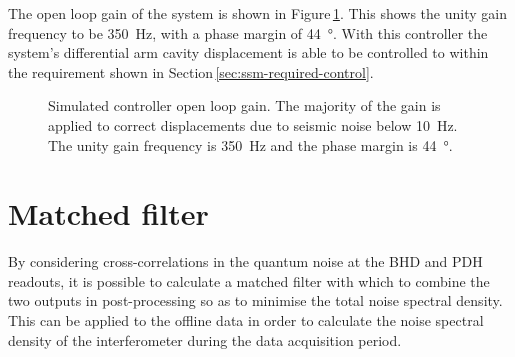 The open loop gain of the system is shown in Figure\,\ref{fig:open-loop-gain}. This shows the unity gain frequency to be \SI{350}{\hertz}, with a phase margin of \SI{44}{\degree}. With this controller the system's differential arm cavity displacement is able to be controlled to within the requirement shown in Section\,\ref{sec:ssm-required-control}.

\begin{figure}
  
  \caption[Simulated controller open loop gain]{\label{fig:open-loop-gain}Simulated \SSM{} controller open loop gain. The majority of the gain is applied to correct displacements due to seismic noise below \SI{10}{\hertz}. The unity gain frequency is \SI{350}{\hertz} and the phase margin is \SI{44}{\degree}.}
\end{figure}

\section{\label{sec:optimal-filter}Matched filter}
By considering cross-correlations in the quantum noise at the \gls{BHD} and \gls{PDH} readouts, it is possible to calculate a matched filter with which to combine the two outputs in post-processing so as to minimise the total noise spectral density. This can be applied to the offline data in order to calculate the noise spectral density of the interferometer during the data acquisition period.

